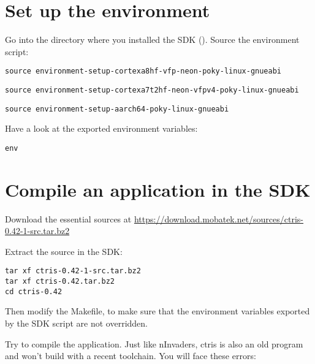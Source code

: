 \section{Set up the environment}

Go into the directory where you installed the SDK
(). Source the environment script:
\if{}
\begin{verbatim}
source environment-setup-cortexa8hf-vfp-neon-poky-linux-gnueabi
\end{verbatim}
\fi
\if{}
\begin{verbatim}
source environment-setup-cortexa7t2hf-neon-vfpv4-poky-linux-gnueabi
\end{verbatim}
\fi
\if{}
\begin{verbatim}
source environment-setup-aarch64-poky-linux-gnueabi
\end{verbatim}
\fi

Have a look at the exported environment variables:
\begin{verbatim}
env
\end{verbatim}

\section{Compile an application in the SDK}

Download the essential  sources at
\url{https://download.mobatek.net/sources/ctris-0.42-1-src.tar.bz2}

Extract the source in the SDK:
\begin{verbatim}
tar xf ctris-0.42-1-src.tar.bz2
tar xf ctris-0.42.tar.bz2
cd ctris-0.42
\end{verbatim}

Then modify the Makefile, to make sure that the environment variables exported
by the SDK script are not overridden.

Try to compile the application. Just like nInvaders, ctris is also an old
program and won't build with a recent toolchain. You will face these
errors:

